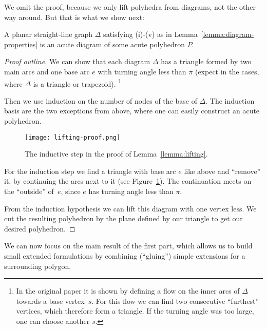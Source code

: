 We omit the proof, because we only lift polyhedra from diagrams, not the other way around. But that is what we show next:

\begin{lemma}\label{lemma:lifting}
  A planar straight-line graph $\Delta$ satisfying (i)-(v) as in Lemma~\ref{lemma:diagram-properties} is an acute diagram of some acute polyhedron $P$.
\end{lemma}

\begin{proof}[Proof outline]
  We can show that each diagram $\Delta$ has a triangle formed by two main arcs and one base arc $e$ with turning angle less than $\pi$ (expect in the cases, where $\Delta$ is a triangle or trapezoid). \footnote{In the original paper it is shown by defining a flow on the inner arcs of $\Delta$ towards a base vertex~$s$. For this flow we can find two consecutive ``furthest'' vertices, which therefore form a triangle. If the turning angle was too large, one can choose another $s$.}

  Then we use induction on the number of nodes of the base of $\Delta$. The induction basis are the two exceptions from above, where one can easily construct an acute polyhedron.

  \begin{figure}[ht]
    \centering
    \texttt{[image: lifting-proof.png]}
    \caption{The inductive step in the proof of Lemma~\ref{lemma:lifting}. \cite[Figure 2]{shitov2020sublinear}}
    \label{fig:lifting-proof}
  \end{figure}

  For the induction step we find a triangle with base arc $e$ like above and ``remove'' it, by continuing the arcs next to it (see Figure~\ref{fig:lifting-proof}). The continuation meets on the ``outside'' of~$e$, since $e$ has turning angle less than $\pi$. 

  From the induction hypothesis we can lift this diagram with one vertex less. We cut the resulting polyhedron by the plane defined by our triangle to get our desired polyhedron.
\end{proof}

We can now focus on the main result of the first part, which allows us to build small extended formulations by combining (``gluing'') simple extensions for a surrounding polygon.

